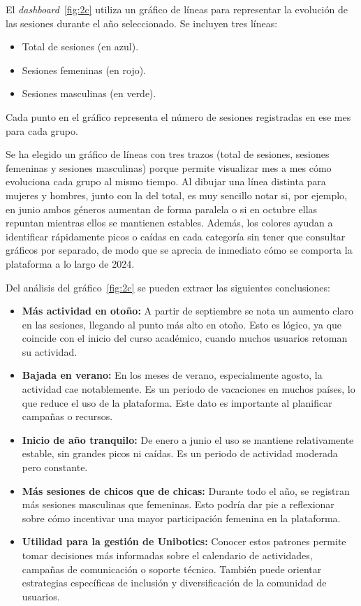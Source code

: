 \documentclass[a4paper, 12pt]{book}
\begin{document}
El \textit{dashboard}~\ref{fig:2c} utiliza un gráfico de líneas para representar la evolución de las sesiones durante el año seleccionado. Se incluyen tres líneas:

\begin{itemize}
  \item Total de sesiones (en azul).
  \item Sesiones femeninas (en rojo).
  \item Sesiones masculinas (en verde).
\end{itemize}

Cada punto en el gráfico representa el número de sesiones registradas en ese mes para cada grupo.

Se ha elegido un gráfico de líneas con tres trazos (total de sesiones, sesiones femeninas y sesiones masculinas) porque permite visualizar mes a mes cómo evoluciona cada grupo al mismo tiempo. Al dibujar una línea distinta para mujeres y hombres, junto con la del total, es muy sencillo notar si, por ejemplo, en junio ambos géneros aumentan de forma paralela o si en octubre ellas repuntan mientras ellos se mantienen estables. Además, los colores ayudan a identificar rápidamente picos o caídas en cada categoría sin tener que consultar gráficos por separado, de modo que se aprecia de inmediato cómo se comporta la plataforma a lo largo de 2024.

Del análisis del gráfico~\ref{fig:2c} se pueden extraer las siguientes conclusiones:

\begin{itemize}
  \item \textbf{Más actividad en otoño:} A partir de septiembre se nota un aumento claro en las sesiones, llegando al punto más alto en otoño. Esto es lógico, ya que coincide con el inicio del curso académico, cuando muchos usuarios retoman su actividad.

  \item \textbf{Bajada en verano:} En los meses de verano, especialmente agosto, la actividad cae notablemente. Es un periodo de vacaciones en muchos países, lo que reduce el uso de la plataforma. Este dato es importante al planificar campañas o recursos.

  \item \textbf{Inicio de año tranquilo:} De enero a junio el uso se mantiene relativamente estable, sin grandes picos ni caídas. Es un periodo de actividad moderada pero constante.

  \item \textbf{Más sesiones de chicos que de chicas:} Durante todo el año, se registran más sesiones masculinas que femeninas. Esto podría dar pie a reflexionar sobre cómo incentivar una mayor participación femenina en la plataforma.

  \item \textbf{Utilidad para la gestión de Unibotics:} Conocer estos patrones permite tomar decisiones más informadas sobre el calendario de actividades, campañas de comunicación o soporte técnico. También puede orientar estrategias específicas de inclusión y diversificación de la comunidad de usuarios.
\end{itemize}
\end{document}
